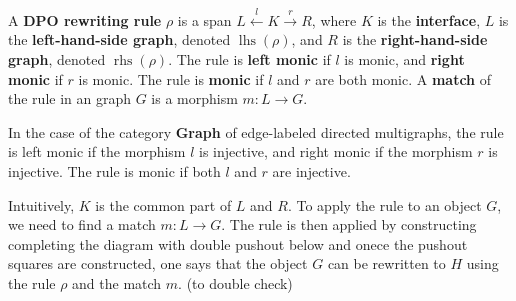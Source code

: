 \begin{definition}
  \label{def:grs:dpo_rule}
A \textbf{DPO rewriting rule} $\rho$ is a span \( L \overset{l}{\leftarrow} K \overset{r}{\rightarrow} R \), where \( K \) is the \textbf{interface}, \( L \) is the \textbf{left-hand-side graph}, denoted \( \operatorname{lhs}(\rho) \), and \( R \) is the \textbf{right-hand-side graph}, denoted \( \operatorname{rhs}(\rho) \). The rule is \textbf{left monic} if \( l \) is monic, and \textbf{right monic} if \( r \) is monic. 
The rule is \textbf{monic} if $l$ and $r$ are both monic.
A \textbf{match} of the rule in an graph \( G \) is a morphism \( m: L \rightarrow G \).   
\end{definition}
In the case of the category \textbf{Graph} of edge-labeled directed multigraphs, the rule is left monic if the morphism \( l \) is injective, and right monic if the morphism \( r \) is injective. The rule is monic if both \( l \) and \( r \) are injective.

Intuitively, $K$ is the common part of $L$ and $R$. To apply the rule to an object $G$, we need to find a match $m:L \to G$. The rule is then applied by constructing completing the diagram with double pushout below and onece the pushout squares are constructed, one says that the object $G$ can be rewritten to $H$ using the rule $\rho$ and the match $m$. (to double check)
\begin{center}
\end{center}

